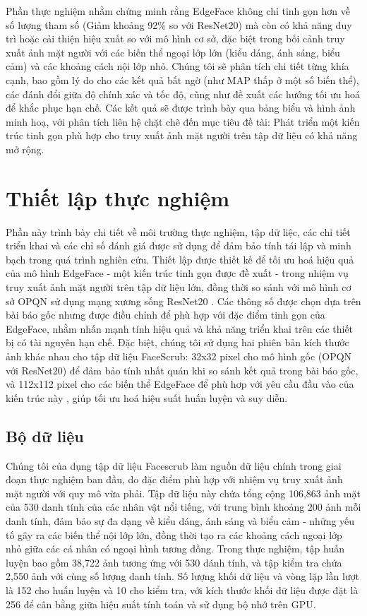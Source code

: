 Phần thực nghiệm nhằm chứng minh rằng EdgeFace không chỉ tinh gọn hơn về số lượng tham số (Giảm khoảng 92\% so với ResNet20) mà còn có khả năng duy trì hoặc cải thiện hiệu xuất so với mô hình cơ sở, đặc biệt trong bối cảnh truy xuất ảnh mặt người với các biến thể ngoại lớp lớn (kiểu dáng, ánh   sáng, biểu cảm) và các khoảng cách nội lớp nhỏ. Chúng tôi sẽ phân tích chi tiết từng khía cạnh, bao gồm lý do cho các kết quả bất ngờ (như MAP thấp ở một số biến thể), các đánh đổi giữa độ chính xác và tốc độ, cũng như đề xuất các hướng tối ưu hoá để khắc phục hạn chế. Các kết quả sẽ được trình bày qua bảng biểu và hình ảnh minh hoạ, với phân tích liên hệ chặt chẽ đến mục tiêu đề tài: Phát triển một kiến trúc tinh gọn phù hợp cho truy xuất ảnh mặt người trên tập dữ liệu có khả năng mở rộng.

\section {Thiết lập thực nghiệm}
Phần này trình bày chi tiết về môi trường thực nghiệm, tập dữ liệc, các chi tiết triển khai và các chỉ số đánh giá được sử dụng để đảm bảo tính tái lập và minh bạch trong quá trình nghiên cứu. Thiết lập được thiết kế để tối ưu hoá hiệu quả của mô hình EdgeFace - một kiến trúc tinh gọn được đề xuất - trong nhiệm vụ truy xuất ảnh mặt người trên tập dữ liệu lớn, đồng thời so sánh với mô hình cơ sở OPQN sử dụng mạng xương sống ResNet20 \cite{opqn}. Các thông số được chọn dựa trên bài báo gốc nhưng được điều chỉnh để phù hợp với đặc điểm tinh gọn của EdgeFace, nhằm nhấn mạnh tính hiệu quả và khả năng triển khai trên các thiết bị có tài nguyên hạn chế. Đặc biệt, chúng tôi sử dụng hai phiên bản kích thước ảnh khác nhau cho tập dữ liệu FaceScrub: 32x32 pixel cho mô hình gốc (OPQN với ResNet20) để đảm bảo tính nhất quán khi so sánh kết quả trong bài báo gốc, và 112x112 pixel cho các biến thể EdgeFace để phù hơp với yêu cầu đầu vào của kiến trúc này \cite{george2024edgeface}, giúp tối ưu hoá hiệu suất huấn luyện và suy diễn.

\subsection{Bộ dữ liệu}
Chúng tôi của dụng tập dữ liệu Facescrub \cite{facescrub} làm nguồn dữ liệu chính trong giai đoạn thực nghiệm ban đầu, do đặc điểm phù hợp với nhiệm vụ truy xuất ảnh mặt người với quy mô vừa phải. Tập dữ liệu này chứa tổng cộng 106,863 ảnh mặt của 530 danh tính của các nhân vật nổi tiếng, với trung bình khoảng 200 ảnh mỗi danh tính, đảm bảo sự đa dạng về kiểu dáng, ánh sáng và biểu cảm - những yếu tố gây ra các biến thể nội lớp lớn, đồng thời tạo ra các khoảng cách ngoại lớp nhỏ giữa các cá nhân có ngoại hình tương đồng. Trong thực nghiệm, tập huấn luyện bao gồm 38,722 ảnh tương ứng với 530 dánh tính, và tập kiểm tra chứa 2,550 ảnh với cùng số lượng danh tính. Số lượng khối dữ liệu và vòng lặp lần lượt là 152 cho huấn luyện và 10 cho kiểm tra, với kích thước khối dữ liệu được đặt là 256 để cân bằng giữa hiệu suất tính toán và sử dụng bộ nhớ trên GPU.

